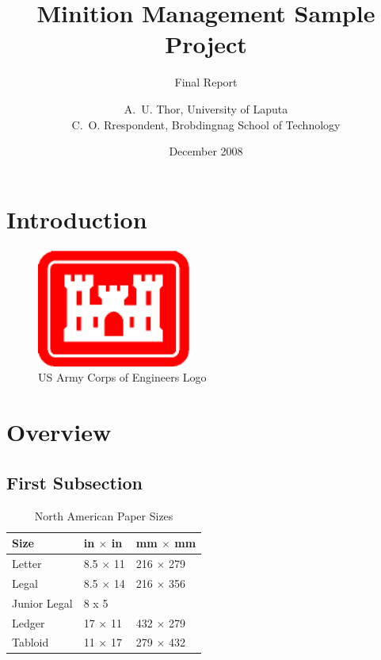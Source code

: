\documentclass{estcpmm}
\begin{document}
\frontmatter


\title[Sample Project]{Minition Management Sample Project}
\subtitle{Final Report}
\date{December 2008}
\author{A.~U. Thor,  University of Laputa\\
  C.~O. Rrespondent, Brobdingnag School of Technology}
\maketitle

\tableofcontents
\listoffigures
\listoftables


\mainmatter

\section{Introduction}
\label{sec:intro}


\lipsum[1-12]

\begin{figure}
  \centering
  \includegraphics[width=2in]{red_corps_castle2}
  \caption{US Army Corps of Engineers Logo}
  \label{fig:castle}
\end{figure}

\section{Overview}

\subsection{First Subsection}


\lipsum[45-46]

\begin{table}[htbp]
  \centering
  \begin{tabular}{lll}
    \hline
    Size & in $\times$ in &mm $\times$ mm\\
    \hline
    Letter &8.5 $\times$ 11 &216 $\times$ 279\\
    Legal &8.5 $\times$ 14 &216 $\times$ 356\\
    Junior Legal &8 x 5 &\\
    Ledger &17 $\times$ 11 &432 $\times$ 279\\
    Tabloid &11 $\times$ 17 &279 $\times$ 432\\
    \hline
  \end{tabular}
  \caption{North American Paper Sizes}
  \label{tab:paper}
\end{table}
\end{document}
